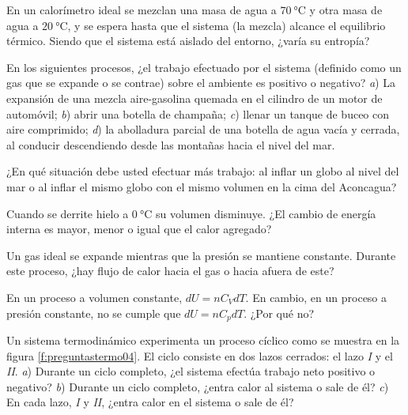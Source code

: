 %
\begin{Exercise}
  {}{}
  En un calorímetro ideal se mezclan una masa de agua a $\SI{70}{\celsius}$ y otra masa de agua a $\SI{20}{\celsius}$, y se espera hasta que el sistema (la mezcla) alcance el equilibrio térmico. Siendo que el sistema está aislado del entorno, ¿varía su entropía?
\end{Exercise}
%
\begin{Exercise}
  En los siguientes procesos, ¿el trabajo efectuado por el sistema (definido como un gas que se expande o se contrae) sobre el ambiente es positivo o negativo? \textit{a}) La expansión de una mezcla aire-gasolina quemada en el cilindro de un motor de automóvil; \textit{b}) abrir una botella de champaña; \textit{c}) llenar un tanque de buceo con aire comprimido; \textit{d}) la abolladura parcial de una botella de agua vacía y cerrada, al conducir descendiendo desde las montañas hacia el nivel del mar.
\end{Exercise}
%
\begin{Exercise}
  ¿En qué situación debe usted efectuar más trabajo: al inflar un globo al nivel del mar o al inflar el mismo globo con el mismo volumen en la cima del Aconcagua?
\end{Exercise}
%
\begin{Exercise}
  {}{}
  Cuando se derrite hielo a $\SI{0}{\celsius}$ su volumen disminuye. ¿El cambio de energía interna es mayor, menor o igual que el calor agregado?
\end{Exercise}
%
\begin{Exercise}
  Un gas ideal se expande mientras que la presión se mantiene constante. Durante este proceso, ¿hay flujo de calor hacia el gas o hacia afuera de este?
\end{Exercise}
%
\begin{Exercise}
  En un proceso a volumen constante, $dU = nC_VdT$. En cambio, en un proceso a presión constante, no se cumple que $dU = nC_pdT$. ¿Por qué no?
\end{Exercise}
%
\begin{Exercise}\label{p:preguntastermo04}
  Un sistema termodinámico experimenta un proceso cíclico como se muestra en la figura \ref{f:preguntastermo04}. El ciclo consiste en dos lazos cerrados: el lazo \textit{I} y el \textit{II}. \textit{a}) Durante un ciclo completo, ¿el sistema efectúa trabajo neto positivo o negativo? \textit{b}) Durante un ciclo completo, ¿entra calor al sistema o sale de él? \textit{c}) En cada lazo, \textit{I} y \textit{II}, ¿entra calor en el sistema o sale de él?
\end{Exercise}
